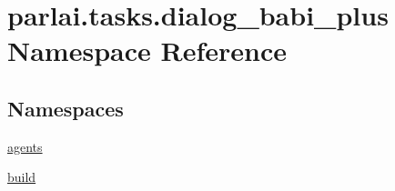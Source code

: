 \hypertarget{namespaceparlai_1_1tasks_1_1dialog__babi__plus}{}\section{parlai.\+tasks.\+dialog\+\_\+babi\+\_\+plus Namespace Reference}
\label{namespaceparlai_1_1tasks_1_1dialog__babi__plus}
\subsection*{Namespaces}
\begin{DoxyCompactItemize}
\item 
 \hyperlink{namespaceparlai_1_1tasks_1_1dialog__babi__plus_1_1agents}{agents}
\item 
 \hyperlink{namespaceparlai_1_1tasks_1_1dialog__babi__plus_1_1build}{build}
\end{DoxyCompactItemize}
